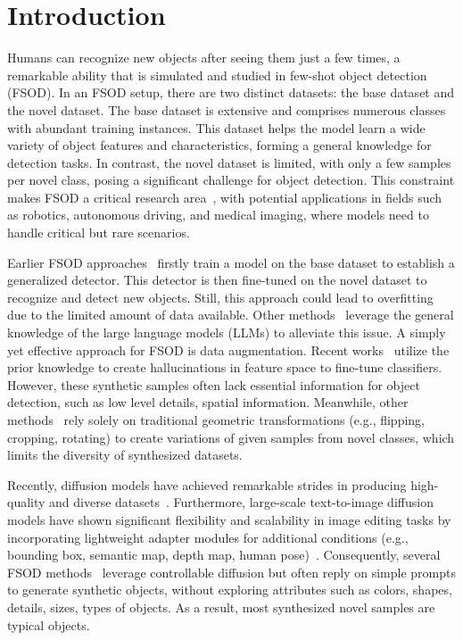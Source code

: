 \section{Introduction}
\label{sec:introduction}

Humans can recognize new objects after seeing them just a few times, a remarkable ability that is simulated and studied in few-shot object detection (FSOD). In an FSOD setup, there are two distinct datasets: the base dataset and the novel dataset. The base dataset is extensive and comprises numerous classes with abundant training instances. This dataset helps the model learn a wide variety of object features and characteristics, forming a general knowledge for detection tasks. In contrast, the novel dataset is limited, with only a few samples per novel class, posing a significant challenge for object detection. This constraint makes FSOD a critical research area~\citep{meta-rcnn, yolo-reweighting, rpn-attention, TFA, max-margin, trans-int, meta-detr, han2022few, bulat2023fs}, with potential applications in fields such as robotics, autonomous driving, and medical imaging, where models need to handle critical but rare scenarios. 

Earlier FSOD approaches~\citep{TFA, defrcn, meta-rcnn, meta-detr} firstly train a model on the base dataset to establish a generalized detector. This detector is then fine-tuned on the novel dataset to recognize and detect new objects. Still, this approach %
could lead to overfitting due to the limited amount of data available. Other methods~\citep{zhu2021semantic, li2023disentangle} leverage the general knowledge of the large language models (LLMs) to alleviate this issue. A simply yet effective approach for FSOD is data augmentation. Recent works~\citep{zhang2021hallucination, vu2023few} utilize the prior knowledge to create hallucinations in feature space to fine-tune classifiers. However, these synthetic samples often lack essential information for object detection, such as low level details, spatial information. Meanwhile, other methods~\citep{li2021transformation, demirel2023meta} rely solely on traditional geometric transformations (e.g., flipping, cropping, rotating) to create variations of given samples from novel classes, which limits the diversity of synthesized datasets.



Recently, diffusion models have achieved remarkable strides in producing high-quality and diverse  datasets~\citep{nichol2021glide, rombach2022high, ramesh2022hierarchical, saharia2022photorealistic}. Furthermore, large-scale text-to-image diffusion models have shown significant flexibility and scalability in image editing tasks by incorporating lightweight adapter modules for additional conditions (e.g., bounding box, semantic map, depth map, human pose)~\citep{zhang2023adding, li2023gligen, zhuang2023task}. Consequently, several FSOD methods~\citep{lin2023explore, fang2024data, wang2024snida} leverage controllable diffusion but often reply on simple prompts to generate synthetic objects, without exploring attributes  such as colors, shapes, details, sizes, types of objects. As a result, most synthesized novel samples are typical objects.

